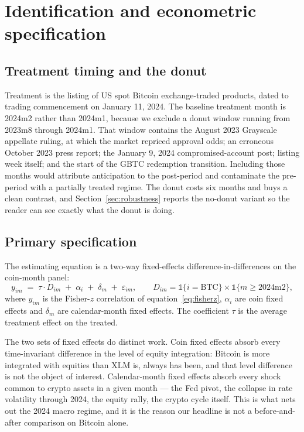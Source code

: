 \documentclass[12pt,a4paper]{article}
\begin{document}
\section{Identification and econometric specification}\label{sec:strategy}

\subsection{Treatment timing and the donut}

Treatment is the listing of US spot Bitcoin exchange-traded products, dated to trading commencement on January 11, 2024. The baseline treatment month is 2024m2 rather than 2024m1, because we exclude a donut window running from 2023m8 through 2024m1. That window contains the August 2023 Grayscale appellate ruling, at which the market repriced approval odds; an erroneous October 2023 press report; the January 9, 2024 compromised-account post; listing week itself; and the start of the GBTC redemption transition. Including those months would attribute anticipation to the post-period and contaminate the pre-period with a partially treated regime. The donut costs six months and buys a clean contrast, and Section~\ref{sec:robustness} reports the no-donut variant so the reader can see exactly what the donut is doing.

\subsection{Primary specification}

The estimating equation is a two-way fixed-effects difference-in-differences on the coin-month panel:
\begin{equation}
y_{im} \;=\; \tau \cdot D_{im} \;+\; \alpha_i \;+\; \delta_m \;+\; \varepsilon_{im},
\qquad D_{im} = \mathbb{1}\{i = \mathrm{BTC}\} \times \mathbb{1}\{m \ge 2024\mathrm{m}2\},
\label{eq:did}
\end{equation}
where $y_{im}$ is the Fisher-$z$ correlation of equation~\eqref{eq:fisherz}, $\alpha_i$ are coin fixed effects and $\delta_m$ are calendar-month fixed effects. The coefficient $\tau$ is the average treatment effect on the treated.

The two sets of fixed effects do distinct work. Coin fixed effects absorb every time-invariant difference in the level of equity integration: Bitcoin is more integrated with equities than XLM is, always has been, and that level difference is not the object of interest. Calendar-month fixed effects absorb every shock common to crypto assets in a given month — the Fed pivot, the collapse in rate volatility through 2024, the equity rally, the crypto cycle itself. This is what nets out the 2024 macro regime, and it is the reason our headline is not a before-and-after comparison on Bitcoin alone.
\end{document}
